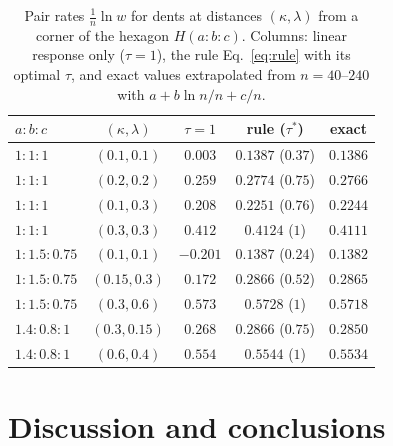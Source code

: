\documentclass[aps,pre,twocolumn,superscriptaddress,nofootinbib,floatfix]{revtex4-2}
\begin{document}
\begin{table}[t]
\caption{Pair rates $\frac1n\ln w$ for dents at distances $(\kappa,\lambda)$ from a corner of the hexagon $H(a{:}b{:}c)$. Columns: linear response only ($\tau=1$), the rule Eq.~\eqref{eq:rule} with its optimal $\tau$, and exact values extrapolated from $n=40$--$240$ with $a+b\ln n/n+c/n$.}
\label{tab:lozenge}
\begin{ruledtabular}
\begin{tabular}{lcccc}
$a{:}b{:}c$ & $(\kappa,\lambda)$ & $\tau=1$ & rule ($\tau^*$) & exact \\
\hline
$1{:}1{:}1$ & $(0.1,0.1)$ & $0.003$ & $0.1387$ ($0.37$) & $0.1386$\\
$1{:}1{:}1$ & $(0.2,0.2)$ & $0.259$ & $0.2774$ ($0.75$) & $0.2766$\\
$1{:}1{:}1$ & $(0.1,0.3)$ & $0.208$ & $0.2251$ ($0.76$) & $0.2244$\\
$1{:}1{:}1$ & $(0.3,0.3)$ & $0.412$ & $0.4124$ ($1$) & $0.4111$\\
$1{:}1.5{:}0.75$ & $(0.1,0.1)$ & $-0.201$ & $0.1387$ ($0.24$) & $0.1382$\\
$1{:}1.5{:}0.75$ & $(0.15,0.3)$ & $0.172$ & $0.2866$ ($0.52$) & $0.2865$\\
$1{:}1.5{:}0.75$ & $(0.3,0.6)$ & $0.573$ & $0.5728$ ($1$) & $0.5718$\\
$1.4{:}0.8{:}1$ & $(0.3,0.15)$ & $0.268$ & $0.2866$ ($0.75$) & $0.2850$\\
$1.4{:}0.8{:}1$ & $(0.6,0.4)$ & $0.554$ & $0.5544$ ($1$) & $0.5534$\\
\end{tabular}
\end{ruledtabular}
\end{table}

\section{Discussion and conclusions}
\label{sec:conclusion}
\end{document}
